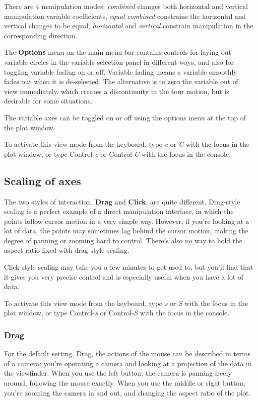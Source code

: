 \documentclass[11pt]{article}
\begin{document}
There are 4 manipulation modes: {\it combined} changes both horizontal
and vertical manipulation variable coefficients, {\it equal combined}
constrains the horizontal and vertical changes to be equal, {\it
horizontal} and {\it vertical} constrain manipulation in the corresponding
direction.

The {\bf Options} menu on the main menu bar contains controls for
laying out variable circles in the variable selection panel in
different ways, and also for toggling variable fading on or
off. Variable fading means a variable smoothly fades out when it is
de-selected. The alternative is to zero the variable out of view
immediately, which creates a discontinuity in the tour motion, but is
desirable for some situations.

The variable axes can be toggled on or off using the options menu at
the top of the plot window.

To activate this view mode from the keyboard, type {\em c} or {\em C}
with the focus in the plot window, or type Control-{\em c} or
Control-{\em C} with the focus in the console.

\subsection{Scaling of axes}
\label{slbl:Scaling}

The two styles of interaction, {\bf Drag} and {\bf Click}, are quite
different.  Drag-style scaling is a perfect example of a direct
manipulation interface, in which the points follow cursor motion in a
very simple way.  However, if you're looking at a lot of data, the
points may sometimes lag behind the cursor motion, making the degree
of panning or zooming hard to control.  There's also no way to
hold the aspect ratio fixed with drag-style scaling.

Click-style scaling may take you a few minutes to get used to, but
you'll find that it gives you very precise control and is especially
useful when you have a lot of data.

To activate this view mode from the keyboard, type {\em s} or {\em S}
with the focus in the plot window, or type Control-{\em s} or
Control-{\em S} with the focus in the console.

\subsubsection{Drag}

For the default setting, Drag, the actions of the mouse can be
described in terms of a camera:  you're operating a camera and
looking at a projection of the data in the viewfinder.  When you use
the left button, the camera is panning freely around, following the
mouse exactly.  When you use the middle or right button, you're
zooming the camera in and out, and changing the aspect ratio of
the plot.
\end{document}

